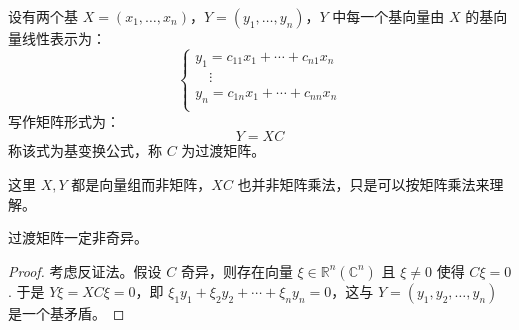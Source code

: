 
\begin{definition}[基变换与过渡矩阵]
设有两个基 $X=(x_1,\ldots,x_n)$，$Y=(y_1,\ldots,y_n)$，$Y$ 中每一个基向量由 $X$ 的基向量线性表示为：
\[
    \begin{cases}
    y_1=c_{11}x_1+\cdots+c_{n1}x_n\\
    \quad\vdots\\
    y_n=c_{1n}x_1+\cdots+c_{nn}x_n\\
    \end{cases}
\]
写作矩阵形式为：
\[Y=XC\]
称该式为基变换公式，称 $C$ 为过渡矩阵。
\end{definition}

\begin{remark}
这里 $X,Y$ 都是向量组而非矩阵，$XC$ 也并非矩阵乘法，只是可以按矩阵乘法来理解。
\end{remark}

\begin{corollary}
\label{cor:transmatrix}
过渡矩阵一定非奇异。
\end{corollary}
\begin{proof}
考虑反证法。假设 $C$ 奇异，则存在向量 $\xi\in\mathbb R^n(\mathbb C^n)$ 且 $\xi\neq 0$ 使得 $C\xi=0$. 于是 $Y\xi=XC\xi=0$，即 $\xi_1y_1+\xi_2y_2+\cdots+\xi_ny_n=0$，这与 $Y=(y_1,y_2,\ldots,y_n)$ 是一个基矛盾。
\end{proof}

